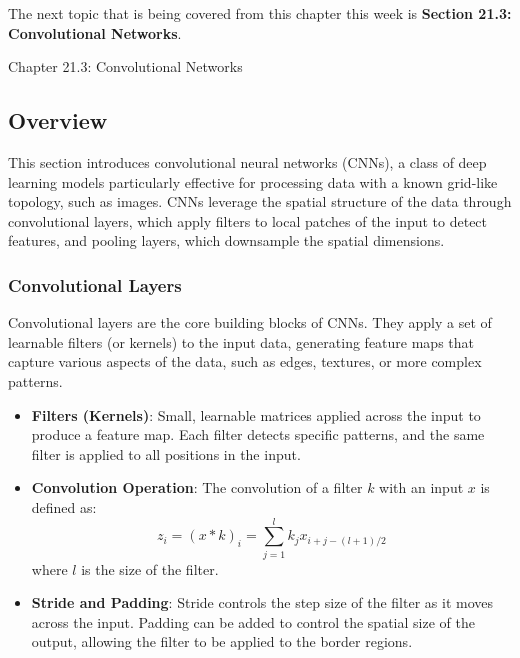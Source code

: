The next topic that is being covered from this chapter this week is \textbf{Section 21.3: Convolutional Networks}.

\begin{notes}{Chapter 21.3: Convolutional Networks}
    \subsection*{Overview}

    This section introduces convolutional neural networks (CNNs), a class of deep learning models particularly effective for processing data with a known grid-like topology, such as images. CNNs leverage 
    the spatial structure of the data through convolutional layers, which apply filters to local patches of the input to detect features, and pooling layers, which downsample the spatial dimensions.
    
    \subsubsection*{Convolutional Layers}
    
    Convolutional layers are the core building blocks of CNNs. They apply a set of learnable filters (or kernels) to the input data, generating feature maps that capture various aspects of the data, such as 
    edges, textures, or more complex patterns.
    
    \begin{highlight}
    
        \begin{itemize}
            \item \textbf{Filters (Kernels)}: Small, learnable matrices applied across the input to produce a feature map. Each filter detects specific patterns, and the same filter is applied to all positions 
            in the input.
            \item \textbf{Convolution Operation}: The convolution of a filter $k$ with an input $x$ is defined as:
            \[
            z_i = (x \ast k)_i = \sum_{j=1}^{l} k_j x_{i+j-(l+1)/2}
            \]
            where $l$ is the size of the filter.
            \item \textbf{Stride and Padding}: Stride controls the step size of the filter as it moves across the input. Padding can be added to control the spatial size of the output, allowing the filter to be 
            applied to the border regions.
        \end{itemize}
    

\end{highlight}
\end{notes}
